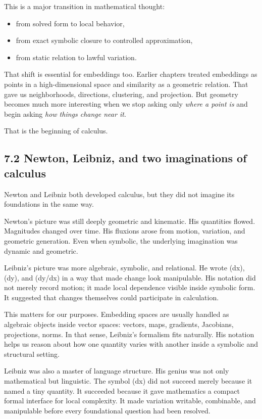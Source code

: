 \documentclass[
]{article}
\providecommand{\tightlist}{%
  \setlength{\itemsep}{0pt}\setlength{\parskip}{0pt}}
\begin{document}
This is a major transition in mathematical thought:

\begin{itemize}
\tightlist
\item
  from solved form to local behavior,
\item
  from exact symbolic closure to controlled approximation,
\item
  from static relation to lawful variation.
\end{itemize}

That shift is essential for embeddings too. Earlier chapters treated
embeddings as points in a high-dimensional space and similarity as a
geometric relation. That gave us neighborhoods, directions, clustering,
and projection. But geometry becomes much more interesting when we stop
asking only \emph{where a point is} and begin asking \emph{how things
change near it}.

That is the beginning of calculus.

\hypertarget{newton-leibniz-and-two-imaginations-of-calculus}{%
\subsection{7.2 Newton, Leibniz, and two imaginations of
calculus}\label{newton-leibniz-and-two-imaginations-of-calculus}}

Newton and Leibniz both developed calculus, but they did not imagine its
foundations in the same way.

Newton's picture was still deeply geometric and kinematic. His
quantities flowed. Magnitudes changed over time. His fluxions arose from
motion, variation, and geometric generation. Even when symbolic, the
underlying imagination was dynamic and geometric.

Leibniz's picture was more algebraic, symbolic, and relational. He wrote
(dx), (dy), and (dy/dx) in a way that made change look manipulable. His
notation did not merely record motion; it made local dependence visible
inside symbolic form. It suggested that changes themselves could
participate in calculation.

This matters for our purposes. Embedding spaces are usually handled as
algebraic objects inside vector spaces: vectors, maps, gradients,
Jacobians, projections, norms. In that sense, Leibniz's formalism fits
naturally. His notation helps us reason about how one quantity varies
with another inside a symbolic and structural setting.

Leibniz was also a master of language structure. His genius was not only
mathematical but linguistic. The symbol (dx) did not succeed merely
because it named a tiny quantity. It succeeded because it gave
mathematics a compact formal interface for local complexity. It made
variation writable, combinable, and manipulable before every
foundational question had been resolved.
\end{document}

